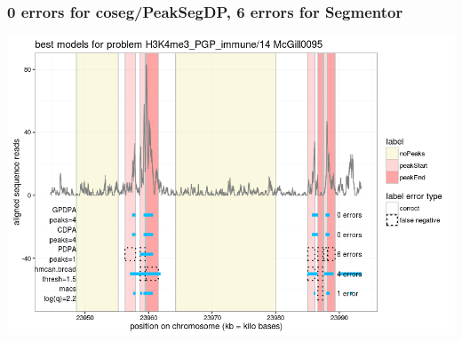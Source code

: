 \documentclass{beamer}
\begin{document}
\begin{frame}
  \frametitle{0 errors for coseg/PeakSegDP, 6 errors for Segmentor}
  \includegraphics[width=\textwidth]{figure-min-train-error-problem2-best.png}
\end{frame}








\end{document}
